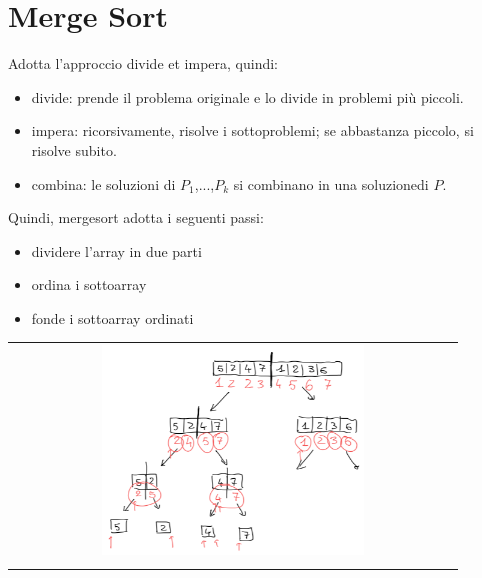 \section{Merge Sort}

Adotta l'approccio divide et impera, quindi:
\begin{itemize}
    \item divide: prende il problema originale e lo divide in problemi più piccoli.
    \item impera: ricorsivamente, risolve i sottoproblemi; se abbastanza piccolo, si risolve subito.
    \item combina: le soluzioni di $P_1$,...,$P_k$ si combinano in una soluzionedi $P$.
\end{itemize}

Quindi, mergesort adotta i seguenti passi:
\begin{itemize}
    \item dividere l'array in due parti
    \item ordina i sottoarray
    \item fonde i sottoarray ordinati
\end{itemize}

\begin{center}
    \begin{tabular}{c}
        \\ \includegraphics[width=0.6\textwidth]{image/MergeSortExample.png} \\ \\
    \end{tabular}
\end{center}

\newpage
